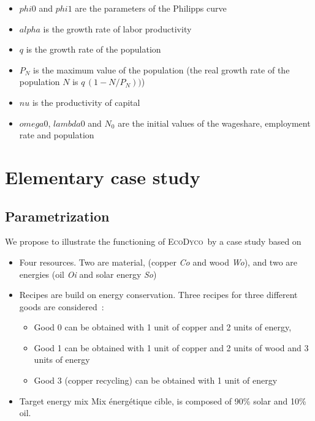 \documentclass[12pt,a4paper]{article}%
\newcommand{\ed}{\textsc{EcoDyco}}
\begin{document}
\begin{itemize}
	\item $phi0$ and $phi1$ are the parameters of the Philipps curve
	
	\item $alpha$ is the growth rate of labor productivity
	
	\item $q$ is the growth rate of the population
	
	\item $P_{N}$ is the maximum value of the population (the real growth rate of the population $N$ is $q \, (1-N/P_{N}))$)
	
	\item $nu$ is the productivity of capital
	
	\item $omega0$, $lambda0$ and $N_{0}$ are the initial values of the wageshare,
	employment rate and population
\end{itemize}

\newpage

\section{Elementary case study}

\subsection{Parametrization}

We propose to illustrate the functioning of \ed\ by a case study
based on 

\begin{itemize}
\item Four resources. Two are material, (copper \textit{Co} and wood \textit{Wo}), and two are energies (oil \textit{Oi} and solar energy \textit{So})

\item  Recipes are build on energy conservation. Three recipes for three different goods are considered~:

	\begin{itemize}
	\item Good 0  can be obtained with 1 unit of copper and 2 units of energy,  
	
	\item Good 1 can be obtained with 1 unit of copper and 2 units of wood and 3 units of energy
	
	\item Good 3 (copper recycling) can be obtained with 1 unit of energy 
	\end{itemize}

\item Target energy mix Mix énergétique cible, is composed of 90\% solar and 10\% oil.
\end{itemize}
\end{document}
